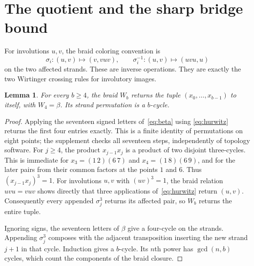 \documentclass[11pt]{article}
\newtheorem{lemma}[theorem]{Lemma}
\begin{document}
\section{The quotient and the sharp bridge bound}

For involutions $u,v$, the braid coloring convention is
\begin{equation}\label{eq:hurwitz}
 \sigma_i:(u,v)\longmapsto(v,vuv),\qquad
 \sigma_i^{-1}:(u,v)\longmapsto(uvu,u)
\end{equation}
on the two affected strands. These are inverse operations. They are
exactly the two Wirtinger crossing rules for involutory images.

\begin{lemma}\label{lem:closure}
For every $b\ge4$, the braid $W_b$ returns the tuple
$(x_0,\ldots,x_{b-1})$ to itself, with $W_4=\beta$. Its strand
permutation is a $b$-cycle.
\end{lemma}
\begin{proof}
Applying the seventeen signed letters of~\eqref{eq:beta} using
\eqref{eq:hurwitz} returns the first four entries exactly. This is a
finite identity of permutations on eight points; the supplement checks
all seventeen steps, independently of topology software.
For $j\ge4$, the product $x_{j-1}x_j$ is a product of two disjoint
three-cycles. This is immediate for $x_3=(1\,2)(6\,7)$ and
$x_4=(1\,8)(6\,9)$, and for the later pairs from their common factors
at the points $1$ and $6$. Thus $(x_{j-1}x_j)^3=1$.
For involutions $u,v$ with $(uv)^3=1$, the braid relation $uvu=vuv$
shows directly that three applications of~\eqref{eq:hurwitz} return
$(u,v)$. Consequently every appended $\sigma_j^3$ returns its affected
pair, so $W_b$ returns the entire tuple.

Ignoring signs, the seventeen letters of $\beta$ give a four-cycle on
the strands. Appending $\sigma_j^3$ composes with the adjacent
transposition inserting the new strand $j+1$ in that cycle. Induction
gives a $b$-cycle. Its $n$th power has $\gcd(n,b)$ cycles, which count
the components of the braid closure.
\end{proof}
\end{document}
